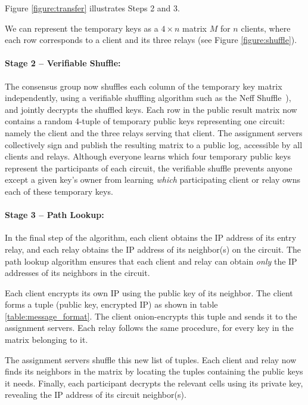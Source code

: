 Figure \ref{figure:transfer} illustrates Steps 2 and 3.

We can represent the temporary keys as a $4 \times n$ matrix $M$ for $n$
clients, where each row corresponds to a client and its three relays (see
Figure \ref{figure:shuffle}).




\paragraph{Stage 2 -- Verifiable Shuffle:}
The consensus group now shuffles
each column of the temporary key matrix independently,
using a verifiable shuffling algorithm
such as the Neff Shuffle~\cite{neff2001verifiable}),
and jointly decrypts the shuffled keys.
Each row in the public result matrix now contains
a random 4-tuple of temporary public keys representing one circuit:
namely the client and the three relays serving that client.
The assignment servers collectively sign and publish the resulting matrix to a
public log, accessible by all clients and relays.
Although everyone learns which four temporary public keys
represent the participants of each circuit,
the verifiable shuffle prevents anyone except a given key's owner from learning
{\em which} participating client or relay owns each of these temporary keys.

\paragraph{Stage 3 -- Path Lookup:}
In the final step of the algorithm, each client obtains the
IP address of its entry relay, and each relay obtains the IP address of its
neighbor(s) on the circuit. The path lookup algorithm ensures that each client
and relay can obtain {\em only} the IP addresses
of its neighbors in the circuit.

Each client encrypts its own IP using the public key of its neighbor.
The client
forms a tuple (public key, encrypted IP) as shown in table
\ref{table:message_format}.
The client onion-encrypts this tuple and sends it to the
assignment servers.
Each relay follows the same procedure, for every key in the
matrix belonging to it.

The assignment servers shuffle this new list of tuples. Each
client and relay now finds its neighbors in the matrix by locating the tuples
containing the public keys it needs. Finally,
each participant decrypts the relevant cells using
its private key, revealing the IP address of its circuit neighbor(s).

